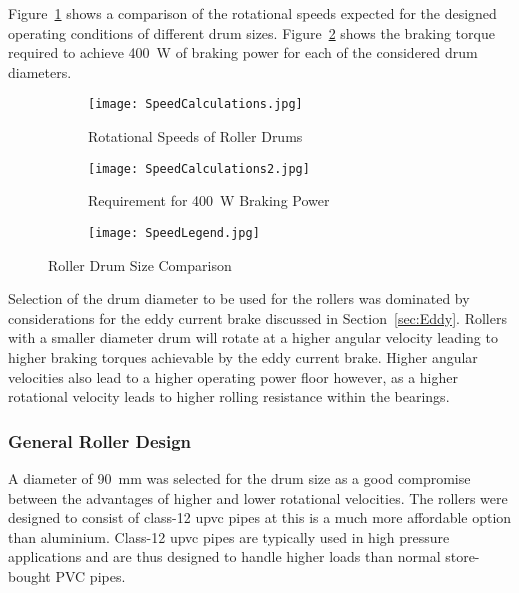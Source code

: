 Figure~\ref{fig:Speed2} shows a comparison of the rotational speeds expected for the designed operating conditions of different drum sizes. Figure~\ref{fig:Speed} shows the braking torque required to achieve \SI{400}{\watt} of braking power for each of the considered drum diameters.

\begin{figure}[H]
	\centering
	\begin{subfigure}[b]{.475\textwidth}
		\centering
		\texttt{[image: SpeedCalculations.jpg]}
		\caption{Rotational Speeds of Roller Drums}
		\label{fig:Speed2}
	\end{subfigure}
	\hfill
	\begin{subfigure}[b]{.475\textwidth}
		\centering
		\texttt{[image: SpeedCalculations2.jpg]}
		\caption{Requirement for \SI{400}{\watt} Braking Power}
		\label{fig:Speed}
	\end{subfigure}
	\begin{subfigure}{.475\textwidth}
		\centering
		\texttt{[image: SpeedLegend.jpg]}
	\end{subfigure}
	\caption{Roller Drum Size Comparison}
	\label{fig:a}
\end{figure}

\vspace*{-0.5cm}	

Selection of the drum diameter to be used for the rollers was dominated by considerations for the eddy current brake discussed in Section~\ref{sec:Eddy}. Rollers with a smaller diameter drum will rotate at a higher angular velocity leading to higher braking torques achievable by the eddy current brake. Higher angular velocities also lead to a higher operating power floor however, as a higher rotational velocity leads to higher rolling resistance within the bearings.

\subsubsection{General Roller Design}

A diameter of \SI{90}{\milli\meter} was selected for the drum size as a good compromise between the advantages of higher and lower rotational velocities. The rollers were designed to consist of class-12 \acf{upvc} pipes at this is a much more affordable option than aluminium. Class-12 \ac{upvc} pipes are typically used in high pressure applications and are thus designed to handle higher loads than normal store-bought PVC pipes. 

